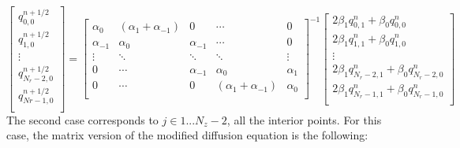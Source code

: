 \documentclass[11pt]{article} %
\begin{document}
\[  \begin{bmatrix}
q_{0,0}^{n+1/2} \\[0.5em]
q_{1,0}^{n+1/2} \\[0.5em]
\vdots \\[0.5em]
q_{N_r-2,0}^{n+1/2} \\[0.5em]
q_{Nr-1,0}^{n+1/2} \\[0.5em]
\end{bmatrix} = 
%
\begin{bmatrix}
\alpha_0 & (\alpha_1+\alpha_{-1}) & 0 & \cdots & 0 \\[0.5em]
\alpha_{-1} & \alpha_0 & \alpha_{-1} &\cdots &0 \\[0.5em]
\vdots & \ddots & \ddots & \ddots & \vdots \\[0.5em]
0 & \cdots & \alpha_{-1} & \alpha_0 & \alpha_1  \\[0.5em]
0 & \cdots & 0 & (\alpha_1+\alpha_{-1}) & \alpha_0 \\[0.5em]
\end{bmatrix}^{-1} 
%
\begin{bmatrix}
2\beta_1q_{0,1}^{n}+ \beta_0q_{0,0}^{n} \\[0.5em]
2\beta_1q_{1,1}^{n}+ \beta_0q_{1,0}^{n} \\[0.5em]
\vdots \\[0.5em]
2\beta_1q_{N_r-2,1}^{n}+\beta_0q_{N_r-2,0}^{n} \\[0.5em]
2\beta_1q_{N_r-1,1}^{n}+ \beta_0q_{N_r-1,0}^{n} \\[0.5em]
\end{bmatrix}
\]
\noindent
The second case corresponds to $j \in 1 ... N_z -2$, all the interior points. For this case, the matrix version of the modified diffusion equation is the following: 
\end{document}
